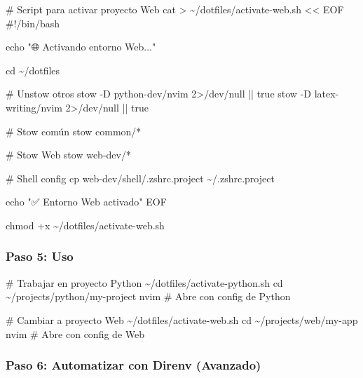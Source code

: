 \documentclass[
  doc,
  floatsintext,
  longtable,
  a4paper,
  nolmodern,
  notxfonts,
  notimes,
  12pt,
  colorlinks=true,linkcolor=blue,citecolor=blue,urlcolor=blue]{apa7}
\newenvironment{Shaded}{\begin{snugshade}}{\end{snugshade}}
\newcommand{\BuiltInTok}[1]{\textcolor[rgb]{0.00,0.23,0.31}{#1}}
\newcommand{\CommentTok}[1]{\textcolor[rgb]{0.37,0.37,0.37}{#1}}
\newcommand{\ExtensionTok}[1]{\textcolor[rgb]{0.00,0.23,0.31}{#1}}
\newcommand{\FunctionTok}[1]{\textcolor[rgb]{0.28,0.35,0.67}{#1}}
\newcommand{\NormalTok}[1]{\textcolor[rgb]{0.00,0.23,0.31}{#1}}
\newcommand{\OperatorTok}[1]{\textcolor[rgb]{0.37,0.37,0.37}{#1}}
\newcommand{\StringTok}[1]{\textcolor[rgb]{0.13,0.47,0.30}{#1}}
\begin{document}
\begin{Shaded}
\begin{Highlighting}[]
\CommentTok{\# Script para activar proyecto Web}
\FunctionTok{cat} \OperatorTok{\textgreater{}}\NormalTok{ \textasciitilde{}/dotfiles/activate{-}web.sh }\OperatorTok{\textless{}\textless{} \textquotesingle{}EOF\textquotesingle{}}
\StringTok{\#!/bin/bash}

\StringTok{echo "🌐 Activando entorno Web..."}

\StringTok{cd \textasciitilde{}/dotfiles}

\StringTok{\# Unstow otros}
\StringTok{stow {-}D python{-}dev/nvim 2\textgreater{}/dev/null || true}
\StringTok{stow {-}D latex{-}writing/nvim 2\textgreater{}/dev/null || true}

\StringTok{\# Stow común}
\StringTok{stow common/*}

\StringTok{\# Stow Web}
\StringTok{stow web{-}dev/*}

\StringTok{\# Shell config}
\StringTok{cp web{-}dev/shell/.zshrc.project \textasciitilde{}/.zshrc.project}

\StringTok{echo "✅ Entorno Web activado"}
\OperatorTok{EOF}

\FunctionTok{chmod}\NormalTok{ +x \textasciitilde{}/dotfiles/activate{-}web.sh}
\end{Highlighting}
\end{Shaded}

\subsubsection{Paso 5: Uso}\label{paso-5-uso}

\begin{Shaded}
\begin{Highlighting}[]
\CommentTok{\# Trabajar en proyecto Python}
\ExtensionTok{\textasciitilde{}/dotfiles/activate{-}python.sh}
\BuiltInTok{cd}\NormalTok{ \textasciitilde{}/projects/python/my{-}project}
\ExtensionTok{nvim}  \CommentTok{\# Abre con config de Python}

\CommentTok{\# Cambiar a proyecto Web}
\ExtensionTok{\textasciitilde{}/dotfiles/activate{-}web.sh}
\BuiltInTok{cd}\NormalTok{ \textasciitilde{}/projects/web/my{-}app}
\ExtensionTok{nvim}  \CommentTok{\# Abre con config de Web}
\end{Highlighting}
\end{Shaded}

\subsubsection{Paso 6: Automatizar con Direnv
(Avanzado)}\label{paso-6-automatizar-con-direnv-avanzado}
\end{document}
